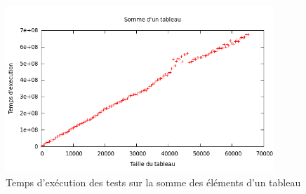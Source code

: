 \begin{figure}[H]
\centering
\includegraphics[width=0.9\textwidth]{arraysum.png}
\caption{Temps d'exécution des tests sur la somme des éléments d'un tableau}
\label{fig:arraysum}
\end{figure}
